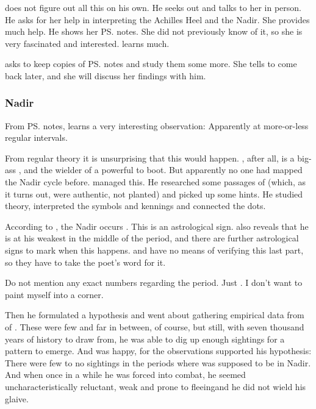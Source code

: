 \subsubsection{\Urizeth}
\Teshrial{} does not figure out all this on his own. 
He seeks out \Urizeth{} and talks to her in person. 
He asks for her help in interpreting the Achilles Heel and the Nadir. 
She provides much help. 
He shows her \ps{\Lothagiel} notes. 
She did not previously know of it, so she is very fascinated and interested. 
\Teshrial{} learns much. 

\Urizeth{} asks to keep copies of \ps{\Lothagiel} notes and study them some more. 
She tells \Teshrial{} to come back later, and she will discuss her findings with him. 





\subsubsection{Nadir}
From \ps{\Lothagiel} notes, \Teshrial{} learns a very interesting observation: 
Apparently  at more-or-less regular intervals. 

From regular \matrix{} theory it is unsurprising that this would happen. 
\Ishnaruchaefir, after all, is a big-ass \vertex, and the wielder of a powerful  to boot. 
But apparently no one had mapped the Nadir cycle before. 
\Lothagiel{} managed this. 
He researched some passages of \WanderersInDarknessEmph (which, as it turns out, were authentic, not planted) and picked up some hints. 
He studied \matrix{} theory, interpreted the symbols and kennings and connected the dots. 

According to \WanderersInDarknessEmph, the Nadir occurs . 
This is an astrological sign. 
\WanderersInDarknessEmph also reveals that he is at his weakest in the middle of the period, and there are further astrological signs to mark when this happens. 
\Teshrial{} and \Lothagiel{} have no means of verifying this last part, so they have to take the poet's word for it. 

Do not mention any exact numbers regarding the period. 
Just . 
I don't want to paint myself into a corner.

Then he formulated a hypothesis and went about gathering empirical data from  of \Ishnaruchaefir. 
These were few and far in between, of course, but still, with seven thousand years of history to draw from, he was able to dig up enough sightings for a pattern to emerge. 
And \Lothagiel{} was happy, for the observations supported his hypothesis: 
There were few to no sightings in the periods where \Ishnaruchaefir{} was supposed to be in Nadir. 
And when once in a while he was forced into combat, he seemed uncharacteristically reluctant, weak and prone to fleeing\dash and he did not wield his glaive. 

